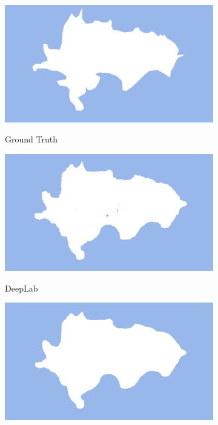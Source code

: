 \documentclass[a4paper,12pt]{ctexart}
\begin{document}
\begin{figure}[h!]
    \begin{subfigure}{0.25\textwidth}
        \centering
        \includegraphics[width=\linewidth]{figures/CAMO_demo1/CAMO_demo1_gt.png}
        \label{fig:demo1_gt}
        \caption{Ground Truth}
    \end{subfigure}%
    \hfill
    \begin{subfigure}{0.25\textwidth}
        \centering
        \includegraphics[width=\linewidth]{figures/CAMO_demo1/CAMO_demo1_pred_ssvm.png}
        \label{fig:demo1_dlap}
        \caption{DeepLab}
    \end{subfigure}%
    \hfill
    \begin{subfigure}{0.25\textwidth}
        \centering
        \includegraphics[width=\linewidth]{figures/CAMO_demo1/CAMO_demo1_pred_crf.png}

\end{subfigure}
\end{figure}
\end{document}
